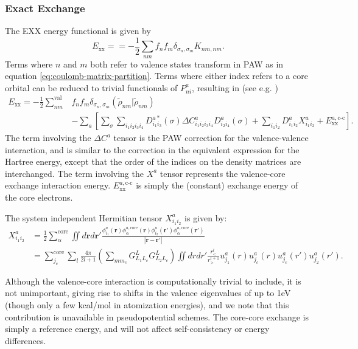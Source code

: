\documentclass[a4paper]{article}
\newcommand{\br}{\mathbf{r}}
\newcommand{\rr}{|\mathbf{r} - \mathbf{r}'|}
\begin{document}
\subsubsection{Exact Exchange}
The EXX energy functional is given by
\begin{equation}
  E_\text{xx} =  = -\frac{1}{2} \sum_{nm} f_{n} f_{m}\delta_{\sigma_n,\sigma_m}K_{nm,nm}.
\end{equation}
Terms where $n$ and $m$ both refer to valence states transform in
PAW as in equation \ref{eq:coulomb-matrix-partition}. Terms where
either index refers to a core orbital can be reduced to
trivial functionals of $P^a_{ni}$, resulting in (see e.g. \cite{Paier2005})
\begin{equation}
  \begin{split}
    E_\text{xx} = -\frac{1}{2}\sum_{nm}^\text{val} &f_{n}f_{m}\delta_{\sigma_n, \sigma_{m}} (\tilde{\rho}_{nm} | \tilde{\rho}_{nm}) \\
    &- \sum_a\left[\sum_\sigma \sum_{i_1i_2i_3i_4} D_{i_1i_3}^{a*}(\sigma) \Delta C_{i_1i_2i_3i_4}^a D_{i_2i_4}^{a}(\sigma) +\sum_{i_1 i_2} D_{i_1 i_2}^a X_{i_1 i_2}^a + E_\text{xx}^{a,\text{c-c}}\right].
  \end{split}
\end{equation}
The term involving the $\Delta C^a$ tensor is the PAW correction for the
valence-valence interaction, and is similar to the correction in the
equivalent expression for the Hartree energy, except that the order of
the indices on the density matrices are interchanged. The term
involving the $X^a$ tensor represents the valence-core exchange
interaction energy. $E_\text{xx}^{a,\text{c-c}}$ is simply the
(constant) exchange energy of the core electrons.

The system independent Hermitian tensor $X_{i_1i_2}^a$ is given by:
%
\begin{equation}
  \begin{split}
    X_{i_1i_2}^a &= \frac{1}{2}\sum_\alpha^\text{core} \iint d\br d\br'\frac{\phi_{i_1}^{a}(\br)\phi_\alpha^{a,\text{core}}(\br) \phi_{i_2}^{a}(\br')\phi_\alpha^{a,\text{core}}(\br')}{\rr}\\
    &= \sum^\text{core}_{j_c} \sum_l\frac{4\pi}{2l+1}\left(\sum_{m m_c} G^L_{L_1 L_c} G^{L}_{L_2 L_c}\right)\iint drdr'  \frac{r_<^l}{r_>^{l+1}} u^a_{j_1}(r)u^a_{j_c}(r) u^a_{j_c}(r')u^a_{j_2}(r').
\end{split}
\end{equation}
%

Although the valence-core interaction is computationally trivial to
include, it is not unimportant, giving rise to shifts in the valence
eigenvalues of up to 1eV (though only a few kcal/mol in atomization
energies), and we note that this contribution is unavailable in
pseudopotential schemes. The core-core exchange is simply a reference
energy, and will not affect self-consistency or energy differences.
\end{document}
